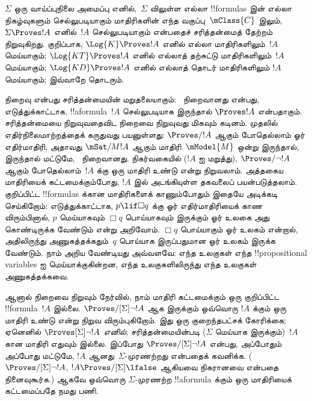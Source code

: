 \documentclass[../../../include/open-logic-section]{subfiles}
\begin{document}


$\Sigma$ ஒரு வாய்ப்புநிலை அமைப்பு எனில்,~$\Sigma$ விலுள்ள எல்லா
!!{formula}s இன் எல்லா நிகழ்வுகளும் செல்லுபடியாகும் மாதிரிகளின் எந்த
வகுப்பு~$\mClass{C}$ இலும், $\Sigma \Proves !A$ எனில்~$!A$
செல்லுபடியாகும் என்பதைச் சரித்தன்மைத் தேற்றம் நிறுவுகிறது. குறிப்பாக,
$\Log{K} \Proves !A$ எனில் எல்லா மாதிரிகளிலும்~$!A$ மெய்யாகும்;
$\Log{KT} \Proves !A$ எனில் எல்லாத் தற்சுட்டு மாதிரிகளிலும்~$!A$
மெய்யாகும்; $\Log{KD} \Proves !A$ எனில் எல்லாத் தொடர் மாதிரிகளிலும்
$!A$ மெய்யாகும்; இவ்வாறே தொடரும்.

நிறைவு என்பது சரித்தன்மையின் மறுதலையாகும்:~ நிறைவானது என்பது,
எடுத்துக்காட்டாக, !!a{formula}~$!A$ செல்லுபடியாக இருந்தால் $\Proves !A$
என்பதாகும். சரித்தன்மையை நிறுவுவதைவிட நிறைவை நிறுவுவது மிகவும் கடினம்.
முதலில் எதிர்நிலைமாற்றத்தைக் கருதுவது பயனுள்ளது: $\Proves/ !A$ ஆகும்
போதெல்லாம் ஓர் எதிர்மாதிரி, அதாவது $\mSat/{M}{!A}$ ஆகும்
மாதிரி~$\mModel{M}$ ஒன்று இருந்தால், இருந்தால் மட்டுமே,~
நிறைவானது. நிகர்வகையில் ($!A$ ஐ மறுத்து), $\Proves/ \lnot !A$ ஆகும்
போதெல்லாம்~$!A$ க்கு ஒரு மாதிரி உண்டு என்று நிறுவலாம். அத்தகைய மாதிரியைக்
கட்டமைக்கும்போது, $!A$ இல் அடங்கியுள்ள தகவலைப் பயன்படுத்தலாம். குறிப்பிட்ட
!!{formula}s க்கான மாதிரிகளைக் காணும்போதும் இதையே அடிக்கடி செய்கிறோம்:
எடுத்துக்காட்டாக, $p \lif \Box q$ க்கு ஓர் எதிர்மாதிரியைக் காண விரும்பினால்,
$p$ மெய்யாகவும் $\Box q$ பொய்யாகவும் இருக்கும் ஓர் உலகை அது கொண்டிருக்க
வேண்டும் என்று அறிவோம். $\Box q$ பொய்யாகும் ஓர் உலகம் என்றால், அதிலிருந்து
அணுகத்தக்கதும்~$q$ பொய்யாக இருப்பதுமான ஓர் உலகம் இருக்க வேண்டும்.
நாம் அறிய வேண்டியது அவ்வளவே: எந்த உலகுகள் எந்த !!{propositional variable}s
ஐ மெய்யாக்குகின்றன, எந்த உலகுகளிலிருந்து எந்த உலகுகள் அணுகத்தக்கவை.

ஆனால் நிறைவை நிறுவும் நேர்வில், நாம் மாதிரி கட்டமைக்கும் ஒரு குறிப்பிட்ட
!!{formula}~$!A$ இல்லை. $\Proves/[\Sigma] \lnot !A$ ஆக இருக்கும் ஒவ்வொரு
$!A$ க்கும் ஒரு மாதிரி உண்டு என்று நிறுவ விரும்புகிறோம். இது ஒரு
குறைந்தபட்சக் கோரிக்கை; ஏனெனில் \emph{$\Proves[\Sigma] \lnot !A$ எனில்},
சரித்தன்மையின்படி ($\Sigma$ மெய்யாக இருக்கும்)~$!A$ கான மாதிரி எதுவும்
இல்லை. இப்போது $\Proves/[\Sigma] \lnot !A$ என்பது, அப்போதும் அப்போது
மட்டுமே, $!A$ ஆனது~$\Sigma$-முரணற்றது என்பதைக் கவனிக்க.
($\Proves/[\Sigma] \lnot !A$, $!A \Proves/[\Sigma] \lfalse$ ஆகியவை
நிகரானவை என்பதை நினைவுகூர்க.) ஆகவே ஒவ்வொரு $\Sigma$-முரணற்ற
!!a{formula} க்கும் ஒரு மாதிரியைக் கட்டமைப்பதே நமது பணி.
\end{document}

